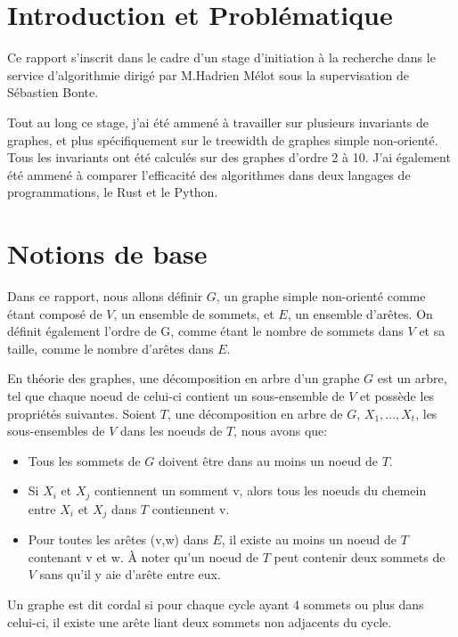 \documentclass[a4paper, 12pt]{article}
\begin{document}
\tableofcontents

\newpage

\section{Introduction et Problématique}
Ce rapport s'inscrit dans le cadre d'un stage d'initiation à la recherche dans le service d'algorithmie
dirigé par M.Hadrien Mélot sous la supervisation de Sébastien Bonte.

Tout au long ce stage, j'ai été ammené à travailler sur plusieurs invariants
de graphes, et plus spécifiquement sur le treewidth de graphes simple non-orienté.
Tous les invariants ont été calculés sur des graphes d'ordre 2 à 10.
J'ai également été ammené à comparer l'efficacité des algorithmes dans 
deux langages de programmations, le Rust et le Python.


\section{Notions de base}
Dans ce rapport, nous allons définir $G$, un graphe simple non-orienté comme étant composé de
$V$, un ensemble de sommets, et $E$, un ensemble d'arêtes. On définit également l'ordre de G, comme étant
le nombre de sommets dans $V$ et sa taille, comme le nombre d'arêtes dans $E$.

En théorie des graphes, une décomposition en arbre d'un graphe $G$ est un arbre,
tel que chaque noeud de celui-ci contient un sous-ensemble de $V$ et possède les propriétés suivantes.
Soient $T$, une décomposition en arbre de $G$,
$X_1,...,X_t$, les sous-ensembles de $V$ dans les noeuds de $T$, nous avons que:

\begin{itemize}
  \item Tous les sommets de $G$ doivent être dans au moins un noeud de $T$.
  \item Si $X_i$ et $X_j$ contiennent un somment v, alors tous les noeuds du chemein entre $X_i$ et $X_j$ dans $T$ contiennent v.
  \item Pour toutes les arêtes (v,w) dans $E$, il existe au moins un noeud de
    $T$ contenant v et w. À noter qu'un noeud de $T$ peut contenir deux sommets de $V$ sans qu'il y aie d'arête entre eux.
\end{itemize}

Un graphe est dit cordal si pour chaque cycle ayant 4 sommets ou plus dans celui-ci, il existe une arête liant deux sommets non adjacents du cycle.
\end{document}
